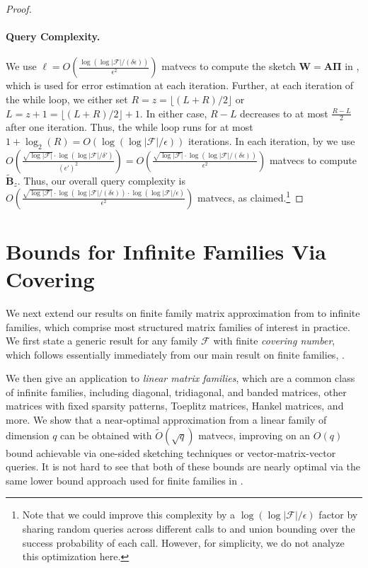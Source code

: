 \documentclass{article}[11pt]
\theoremstyle{definition}
\newcommand{\bv}[1]{\boldsymbol{\mathbf{#1}}}
\newcommand{\F}{\mathcal{F}}
\begin{document}
\begin{proof}
    \paragraph{Query Complexity.}  We use $\ell = O \left (\frac{\log(\log|\F|/(\delta\epsilon))}{\epsilon^2} \right)$ matvecs to compute the sketch $\bv W = \bv A \bv \Pi$ in , which is used for error estimation at each iteration.  Further, at each iteration of the while loop, we either set $R = z = \lfloor (L + R)/2 \rfloor$ or $L = z+1  = \lfloor (L + R)/2 \rfloor + 1$. In either case, $R-L$ decreases to at most $\frac{R-L}{2}$ after one iteration. Thus, the while loop runs for at most $1+\log_2(R) = O(\log(\log|\F|/\epsilon))$ iterations. In each iteration, by  we use $O\left(\frac{\sqrt{\log|\F|} \cdot \log(\log|\F|/\delta')}{(\epsilon')^2}\right)= O\left(\frac{\sqrt{\log|\F|} \cdot \log(\log|\F|/(\delta \epsilon))}{\epsilon^2}\right)$ matvecs to compute $\bv{\tilde B}_z$. Thus, our overall query complexity is $O\left(\frac{\sqrt{\log|\F|} \cdot \log(\log|\F|/(\delta \epsilon)) \cdot \log(\log|\F|/\epsilon)}{\epsilon^2}\right)$ matvecs, as claimed.\footnote{Note that we could improve this complexity by a $\log(\log|\F|/\epsilon)$ factor by sharing random queries across different calls to  and union bounding over the success probability of each call. However, for simplicity, we do not analyze this optimization here.}
\end{proof}

\section{Bounds for Infinite Families Via Covering}\label{sec:covering}


We next extend our results on finite family matrix approximation from    to infinite  families, which comprise most structured matrix families of interest in practice. We first state a generic result for any family $\F$ with finite \emph{covering number}, which follows essentially immediately from our main result on finite families, . 

We then give an application to \emph{linear matrix families}, which are a common class of infinite families, including diagonal, tridiagonal, and banded matrices, other matrices with fixed sparsity patterns, Toeplitz matrices, Hankel matrices, and more. We show that a near-optimal approximation from a linear family of dimension $q$ can be obtained with $\tilde O(\sqrt{q})$ matvecs, improving on an $O(q)$ bound achievable via one-sided sketching techniques or vector-matrix-vector queries. It is not hard to see that both of these bounds are nearly optimal via the same lower bound approach used for finite families in .
\end{document}
